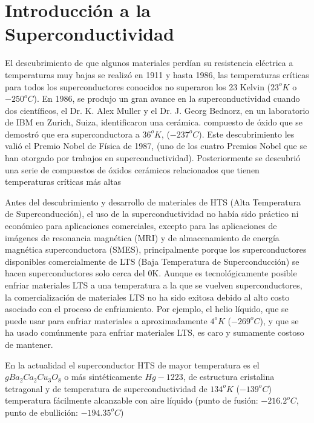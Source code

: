 
\chapter{Introducción a la Superconductividad} %

\label{Chapter4} %



El descubrimiento de que algunos materiales perdían su resistencia eléctrica a temperaturas muy bajas se realizó en 1911 y hasta 1986, las temperaturas críticas para todos los superconductores conocidos no superaron los 23 Kelvin ($23^{o}K$ o $-250^{o}C$). En 1986, se produjo un gran avance en la superconductividad cuando dos científicos, el Dr. K. Alex Muller y el Dr. J. Georg Bednorz, en un laboratorio de IBM en Zurich, Suiza, identificaron una cerámica. compuesto de óxido que se demostró que era superconductora a $36^{o}K$, ($-237^{o}C$). Este descubrimiento les valió el Premio Nobel de Física de 1987, (uno de los cuatro Premios Nobel que se han otorgado por trabajos en superconductividad). Posteriormente se descubrió una serie de compuestos de óxidos cerámicos relacionados que tienen temperaturas críticas más altas

Antes del descubrimiento y desarrollo de materiales de HTS (Alta Temperatura de Superconducción), el uso de la superconductividad no había sido práctico ni económico para aplicaciones comerciales, excepto para las aplicaciones de imágenes de resonancia magnética (MRI) y de almacenamiento de energía magnética superconductora (SMES), principalmente porque los superconductores disponibles comercialmente de LTS (Baja Temperatura de Superconducción) se hacen superconductores solo cerca del 0K. Aunque es tecnológicamente posible enfriar materiales LTS a una temperatura a la que se vuelven superconductores, la comercialización de materiales LTS no ha sido exitosa debido al alto costo asociado con el proceso de enfriamiento. Por ejemplo, el helio líquido, que se puede usar para enfriar materiales a aproximadamente $4^{o}K$ ($-269^{o}C$), y que se ha usado comúnmente para enfriar materiales LTS, es caro y sumamente costoso de mantener.

En la actualidad el superconductor HTS de mayor temperatura es el ${gBa_{2}Ca_{2}Cu_{3}O_{8}}$ o más sintéticamente $Hg-1223$, de estructura cristalina tetragonal y de temperatura de superconductividad de $134^{o}K$ ($-139^{o}C$) temperatura fácilmente alcanzable con aire líquido (punto de fusión: $-216.2^{o}C$, punto de ebullición: $-194.35^{o}C$)


